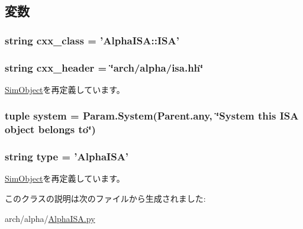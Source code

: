 \subsection{変数}
\hypertarget{classAlphaISA_1_1AlphaISA_a58cd55cd4023648e138237cfc0822ae3}{
\subsubsection[{cxx\_\-class}]{\setlength{\rightskip}{0pt plus 5cm}string {\bf cxx\_\-class} = '{\bf AlphaISA::ISA}'}}
\label{classAlphaISA_1_1AlphaISA_a58cd55cd4023648e138237cfc0822ae3}
\hypertarget{classAlphaISA_1_1AlphaISA_a17da7064bc5c518791f0c891eff05fda}{
\subsubsection[{cxx\_\-header}]{\setlength{\rightskip}{0pt plus 5cm}string {\bf cxx\_\-header} = \char`\"{}arch/alpha/isa.hh\char`\"{}}}
\label{classAlphaISA_1_1AlphaISA_a17da7064bc5c518791f0c891eff05fda}


\hyperlink{classm5_1_1SimObject_1_1SimObject_a17da7064bc5c518791f0c891eff05fda}{SimObject}を再定義しています。\hypertarget{classAlphaISA_1_1AlphaISA_ab737471139f5a296e5b26e8a0e1b0744}{
\subsubsection[{system}]{\setlength{\rightskip}{0pt plus 5cm}tuple {\bf system} = Param.System(Parent.any, \char`\"{}System this {\bf ISA} object belongs to\char`\"{})}}
\label{classAlphaISA_1_1AlphaISA_ab737471139f5a296e5b26e8a0e1b0744}
\hypertarget{classAlphaISA_1_1AlphaISA_acce15679d830831b0bbe8ebc2a60b2ca}{
\subsubsection[{type}]{\setlength{\rightskip}{0pt plus 5cm}string {\bf type} = '{\bf AlphaISA}'}}
\label{classAlphaISA_1_1AlphaISA_acce15679d830831b0bbe8ebc2a60b2ca}


\hyperlink{classm5_1_1SimObject_1_1SimObject_acce15679d830831b0bbe8ebc2a60b2ca}{SimObject}を再定義しています。

このクラスの説明は次のファイルから生成されました:\begin{DoxyCompactItemize}
\item 
arch/alpha/\hyperlink{AlphaISA_8py}{AlphaISA.py}\end{DoxyCompactItemize}
